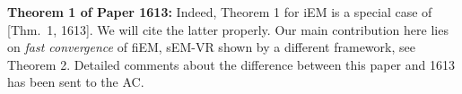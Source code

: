 \documentclass{article}
\begin{document}

\textbf{Theorem 1 of Paper 1613:} Indeed, Theorem 1 for iEM is  a special case of [Thm.~1, 1613]. We will cite the latter properly. Our main contribution here lies on \emph{fast convergence} of fiEM, sEM-VR shown by a different framework, see Theorem 2. Detailed comments about the difference between this paper and 1613 has been sent to the AC.
\end{document}
